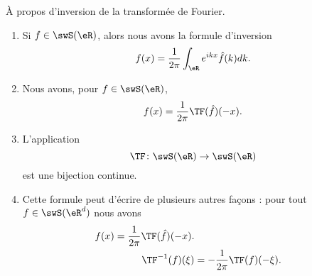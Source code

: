 \begin{proposition}  \label{PROPooLWTJooReGlaN}
	À propos d'inversion de la transformée de Fourier.
	\begin{enumerate}
		\item       \label{ITEMooLVOTooUDJSWt}
		      Si \( f\in\swS(\eR)\), alors nous avons la formule d'inversion
		      \begin{equation}        \label{EQooHIDAooHARdNZ}
			      f(x)=\frac{1}{ 2\pi }\int_{\eR} e^{ikx}\hat f(k)dk.
		      \end{equation}
		\item       \label{ITEMooWINLooJWcDIX}
		      Nous avons, pour \( f\in \swS(\eR)\),
		      \begin{equation}
			      f(x)=\frac{1}{ 2\pi }\TF(\hat f)(-x).
		      \end{equation}
		\item       \label{ITEMooCZYMooRvKTfS}
		      L'application
		      \begin{equation}
			      \TF\colon \swS(\eR)\to \swS(\eR)
		      \end{equation}
		      est une bijection continue.
		\item
		      Cette formule peut d'écrire de plusieurs autres façons : pour tout \( f\in \swS(\eR^d)\) nous avons
		      \begin{subequations}
			      \begin{align}
				      f(x)=\frac{1}{ 2\pi }\TF(\hat f)(-x).     \label{EQooWBZTooPeBNeh} \\
				      \TF^{-1}(f)(\xi) & =-\frac{1}{ 2\pi }\TF(f)(-\xi).
			      \end{align}
		      \end{subequations}
	\end{enumerate}
\end{proposition}

